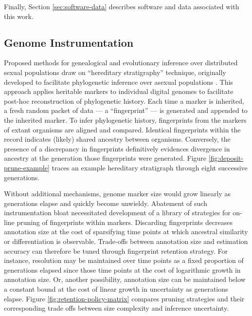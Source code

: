 Finally, Section \ref{sec:software-data} describes software and data associated with this work.

\subsection{Genome Instrumentation}
\label{sec:instrumentation}




Proposed methods for genealogical and evolutionary inference over distributed sexual populations draw on ``hereditary stratigraphy'' technique, originally developed to facilitate phylogenetic inference over asexual populations \citep{moreno2022hstrat}.
This approach applies heritable markers to individual digital genomes to facilitate post-hoc reconstruction of phylogenetic history.
Each time a marker is inherited, a fresh random packet of data --- a ``fingerprint'' --- is generated and appended to the inherited marker.
To infer phylogenetic history, fingerprints from the markers of extant organisms are aligned and compared.
Identical fingerprints within the record indicates (likely) shared ancestry between organisms.
Conversely, the presence of a discrepancy in fingerprints definitively evidences divergence in ancestry at the generation those fingerprints were generated.
Figure \ref{fig:deposit-prune-example} traces an example hereditary stratigraph through eight successive generations.

Without additional mechanisms, genome marker size would grow linearly as generations elapse and quickly become unwieldy.
Abatement of such instrumentation bloat necessitated development of a library of strategies for on-line pruning of fingerprints within markers.
Discarding fingerprints decreases annotation size at the cost of sparsifying time points at which  ancestral similarity or differentiation is observable.
Trade-offs between annotation size and estimation accuracy can therefore be tuned through fingerprint retention strategy.
For instance, resolution may be maintained over time points as a fixed proportion of generations elapsed since those time points at the cost of logarithmic growth in annotation size.
Or, another possibility, annotation size can be maintained below a constant bound at the cost of linear growth in uncertainty as generations elapse.
Figure \ref{fig:retention-policy-matrix} compares pruning strategies and their corresponding trade offs between size complexity and inference uncertainty.

